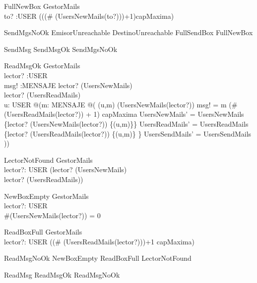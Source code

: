 \begin{schema}{FullNewBox}
\Xi GestorMails \\
to? :USER 
\where
\lnot(((\# (UsersNewMails(to?)))+1)\leq capMaxima)
\end{schema}

\begin{zed}
SendMgsNoOk  EmisorUnreachable \lor DestinoUnreachable \lor FullSendBox \lor FullNewBox \\
\end{zed}
\begin{zed}
SendMsg  SendMsgOk \lor SendMgsNoOk \\
\end{zed}

\begin{schema}{ReadMsgOk}
\Delta GestorMails \\
lector? :USER\\
msg! :MENSAJE 
\where
lector? \in \dom(UsersNewMails) \\
lector? \in \dom(UsersReadMails) \\
\exists u: USER @(\exists m: MENSAJE @(
(u,m) \in (UsersNewMails(lector?)) \land 
msg!  = m \land
(\# (UsersReadMails(lector?)) + 1) \leq capMaxima \land
UsersNewMails' =  UsersNewMails \oplus \{lector? \mapsto (UsersNewMails(lector?))  \setminus \{(u,m)\}\} \land
UsersReadMails' = UsersReadMails \oplus \{lector? \mapsto (UsersReadMails(lector?)) \cup \{(u,m)\} \} \land
UsersSendMails' = UsersSendMails ))
\end{schema}

\begin{schema}{LectorNotFound}
\Xi GestorMails \\
lector?: USER 
\where
(lector? \notin \dom(UsersNewMails) \\
\lor
lector? \notin \dom(UsersReadMails)) 
\end{schema}

\begin{schema}{NewBoxEmpty}
\Xi GestorMails \\
lector?: USER \\
\where
\#(UsersNewMails(lector?)) = 0
\end{schema}

\begin{schema}{ReadBoxFull}
\Xi GestorMails \\
lector?: USER 
\where
\lnot ((\# (UsersReadMails(lector?)))+1 \leq capMaxima)
\end{schema}

\begin{zed}
ReadMsgNoOk  NewBoxEmpty \lor ReadBoxFull \lor LectorNotFound \\
\end{zed}
\begin{zed}
ReadMsg  ReadMsgOk \lor ReadMsgNoOk \\
\end{zed}


